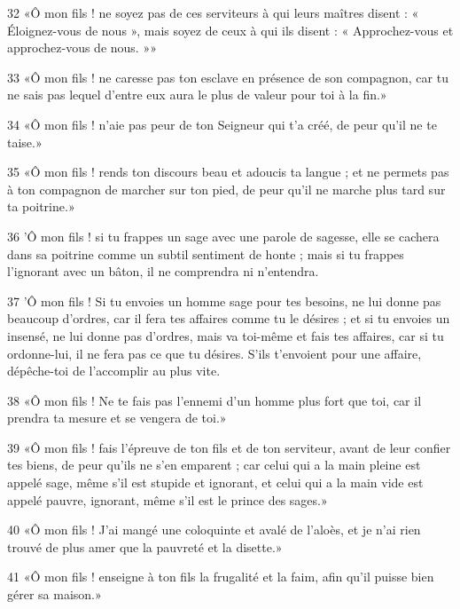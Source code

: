 \par 32 «Ô mon fils ! ne soyez pas de ces serviteurs à qui leurs maîtres disent : « Éloignez-vous de nous », mais soyez de ceux à qui ils disent : « Approchez-vous et approchez-vous de nous. »»

\par 33 «Ô mon fils ! ne caresse pas ton esclave en présence de son compagnon, car tu ne sais pas lequel d'entre eux aura le plus de valeur pour toi à la fin.»

\par 34 «Ô mon fils ! n'aie pas peur de ton Seigneur qui t'a créé, de peur qu'il ne te taise.»

\par 35 «Ô mon fils ! rends ton discours beau et adoucis ta langue ; et ne permets pas à ton compagnon de marcher sur ton pied, de peur qu'il ne marche plus tard sur ta poitrine.»

\par 36 'Ô mon fils ! si tu frappes un sage avec une parole de sagesse, elle se cachera dans sa poitrine comme un subtil sentiment de honte ; mais si tu frappes l'ignorant avec un bâton, il ne comprendra ni n'entendra.

\par 37 'Ô mon fils ! Si tu envoies un homme sage pour tes besoins, ne lui donne pas beaucoup d'ordres, car il fera tes affaires comme tu le désires ; et si tu envoies un insensé, ne lui donne pas d'ordres, mais va toi-même et fais tes affaires, car si tu ordonne-lui, il ne fera pas ce que tu désires. S'ils t'envoient pour une affaire, dépêche-toi de l'accomplir au plus vite.

\par 38 «Ô mon fils ! Ne te fais pas l'ennemi d'un homme plus fort que toi, car il prendra ta mesure et se vengera de toi.»

\par 39 «Ô mon fils ! fais l'épreuve de ton fils et de ton serviteur, avant de leur confier tes biens, de peur qu'ils ne s'en emparent ; car celui qui a la main pleine est appelé sage, même s'il est stupide et ignorant, et celui qui a la main vide est appelé pauvre, ignorant, même s'il est le prince des sages.»

\par 40 «Ô mon fils ! J'ai mangé une coloquinte et avalé de l'aloès, et je n'ai rien trouvé de plus amer que la pauvreté et la disette.»

\par 41 «Ô mon fils ! enseigne à ton fils la frugalité et la faim, afin qu'il puisse bien gérer sa maison.»

